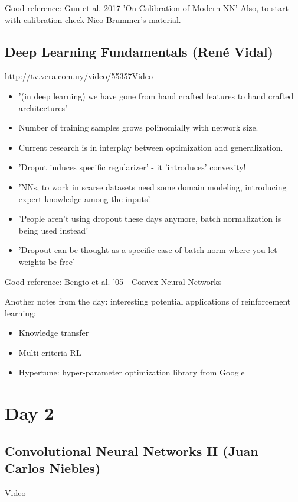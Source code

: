 \documentclass[12pt, english]{article}
\begin{document}
Good reference: Gun et al. 2017 'On Calibration of Modern NN'
Also, to start with calibration check Nico Brummer's material.


\subsection{Deep Learning Fundamentals (René Vidal)}
\url{http://tv.vera.com.uy/video/55357}{Video}

\begin{itemize}
\item '(in deep learning) we have gone from hand crafted features to hand crafted architectures'
\item Number of training samples grows polinomially with network size.
\item Current research is in interplay between optimization and generalization.
\item 'Droput induces specific regularizer' - it 'introduces' convexity!
\item 'NNs, to work in scarse datasets need some domain modeling, introducing expert knowledge among the inputs'.
\item 'People aren't using dropout these days anymore, batch normalization is being used instead'
\item 'Dropout can be thought as a specific case of batch norm where you let weights be free'
\end{itemize}

Good reference: \href{https://www.iro.umontreal.ca/~lisa/pointeurs/convex_nnet_nips2005.pdf}{Bengio et al. '05 - Convex Neural Networks}


Another notes from the day: interesting potential applications of reinforcement learning:
\begin{itemize}
\item Knowledge transfer
\item Multi-criteria RL
\item Hypertune: hyper-parameter optimization library from Google
\end{itemize}


\section{Day 2}

\subsection{Convolutional Neural Networks II (Juan Carlos Niebles)}
\href{http://tv.vera.com.uy/video/54701}{Video}
\end{document}
